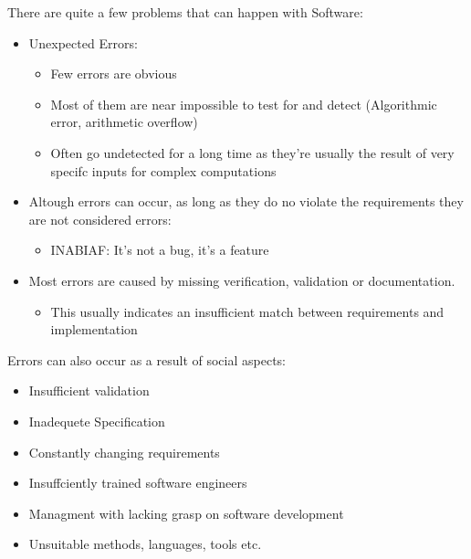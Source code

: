 \documentclass[
../../Software_Engineering_Summary.tex,
]
{subfiles}
\begin{document}
There are quite a few problems that can happen with Software:

\begin{defbox*}
    \begin{itemize}
        \item Unexpected Errors:
        \begin{itemize}
            \item Few errors are obvious
            \item Most of them are near impossible to test for and detect (Algorithmic error, arithmetic overflow)
            \item Often go undetected for a long time as they're usually the result of very specifc inputs for complex computations
        \end{itemize}
        \item Altough errors can occur, as long as they do no violate the requirements they are not considered errors: 
        \begin{itemize}
            \item INABIAF: It's not a bug, it's a feature
        \end{itemize}
        \item Most errors are caused by missing verification, validation or documentation.
        \begin{itemize}
            \item This usually indicates an insufficient match between requirements and implementation
        \end{itemize}
    \end{itemize}
\end{defbox*}

Errors can also occur as a result of social aspects:

\begin{defbox*}
    \begin{itemize}
        \item Insufficient validation
        \item Inadequete Specification
        \item Constantly changing requirements
        \item Insuffciently trained software engineers
        \item Managment with lacking grasp on software development
        \item Unsuitable methods, languages, tools etc.
    \end{itemize}
\end{defbox*}
\end{document}
